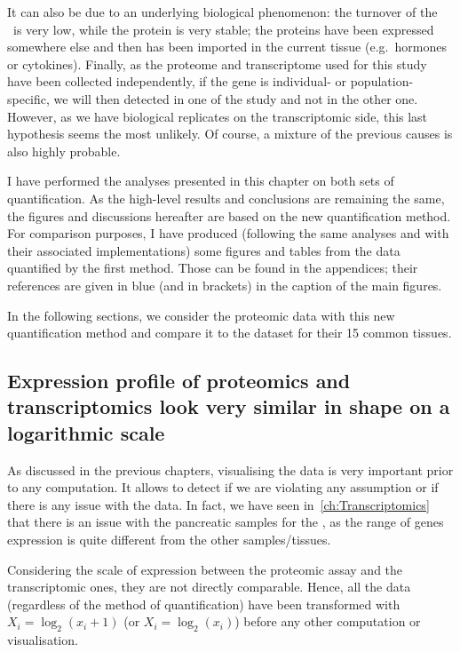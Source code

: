 It can also be due to an underlying biological phenomenon:
the turnover of the \mRNA\ is very low, while the protein is very stable;
the proteins have been expressed somewhere else and then has been imported in the
current tissue (e.g.\ hormones or cytokines). Finally, as the proteome
and transcriptome used for this study have been collected independently, if the
gene is individual- or population-specific, we will then detected in one of the
study and not in the other one. However, as we have biological replicates on the
transcriptomic side, this last hypothesis seems the most unlikely.
Of course, a mixture of the previous causes is also highly probable.

I have performed the analyses presented in this chapter on both sets of
quantification. As the high-level results and conclusions are remaining the same,
the figures and discussions hereafter are based on
the new quantification method. For comparison purposes,
I have produced (following the same analyses and with their associated
implementations) some figures and tables from the data quantified by the first
method. Those can be found in the appendices; their references
are given in blue (and in brackets) in the caption of the main figures.

In the following sections, we consider the proteomic data with this new
quantification method and compare it to the  dataset
for their 15 common tissues.

\subsection{Expression profile of proteomics and transcriptomics look very
similar in shape on a logarithmic scale}
\label{subsec:IntegrationExpProfileSim}

As discussed in the previous chapters, visualising the data is very important
prior to any computation. It allows to detect if we are violating
any assumption or if there is any issue with the data. In fact, we have seen
in~\cref{ch:Transcriptomics} that there is an issue with the pancreatic
samples for the , as the range of genes expression is quite
different from the other samples/tissues.

Considering the scale of expression between the proteomic assay and the
transcriptomic ones, they are not directly comparable. Hence,
all the data (regardless of the method of quantification) have been transformed
with $X_{i}=\log_{2} (x_{i}+1)$ (or $X_{i}=\log_{2} (x_{i})$)
before any other computation or visualisation.


